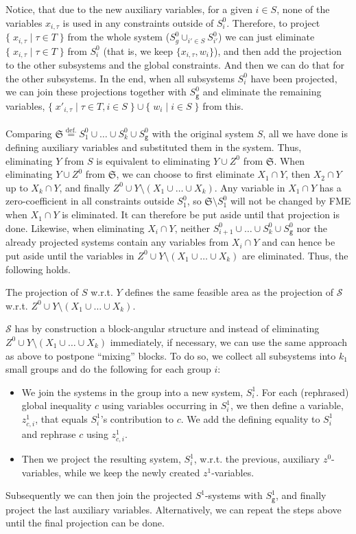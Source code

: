 \documentclass{llncs}
\newcommand{\trt}[1]{\texttt{#1}}
\newcommand{\set}[2]{\{\;{#1}\;|\;{#2}\;\}}
\begin{document}
Notice, that due to the new auxiliary variables, for a given $i\in S$, none of the variables $x_{i,\tau}$ is used in any constraints outside of $S^0_i$. Therefore, to project $\set{x_{i,\tau}}{\tau\in T}$ from the whole system ($S^0_g\cup_{i'\in S}S^0_{i'}$) we can just eliminate $\set{x_{i,\tau}}{\tau\in T}$ from $S_i^0$ (that is, we keep $\{x_{i,\tau}, w_i\}$), and then add the projection to the other subsystems and the global constraints. And then we can do that for the other subsystems. 
In the end, when all subsystems $S^0_i$ have been projected, we can join these projections together with $S^0_\trt{g}$ and eliminate the remaining variables, $\set{x'_{i,\tau}}{\tau\in T, i\in S}\cup\set{w_i}{i\in S}$ from this.
\\\\
\noindent Comparing $\mathfrak{S} \overset{\text{def.}}{=} S_1^0\cup\ldots\cup S_k^0\cup S_\trt{g}^0$ with the original system $S$, all we have done is defining auxiliary variables and substituted them in the system. Thus, eliminating $Y$ from $S$ is equivalent to eliminating $Y \cup Z^0$ from $\mathfrak{S}$. 
%
When eliminating $Y\cup Z^0$ from $\mathfrak{S}$, we can choose to first eliminate $X_1\cap Y$, then $X_2\cap Y$ up to $X_k\cap Y$, and finally $Z^0\cup Y\setminus(X_1\cup \ldots\cup X_k)$. 
Any variable in $X_1\cap Y$ has a zero-coefficient in all constraints outside $S^0_1$, so $\mathfrak{S}\setminus S^0_1$ will not be changed by FME when $X_1\cap Y$ is eliminated. It can therefore be put aside until that projection is done. 
Likewise, when eliminating $X_i\cap Y$, neither $S_{i+1}^0\cup \ldots \cup S_k^0\cup S_\trt{g}^0$ nor the already projected systems contain any variables from $X_i\cap Y$ and can hence be put aside until the variables in $Z^0\cup Y\setminus(X_1\cup \ldots\cup X_k)$ are eliminated. Thus, the following holds. 
%
\begin{proposition}
The projection of $S$ w.r.t. $Y$ defines the same feasible area as 
the projection of $\mathcal{S}$ w.r.t. $Z^0 \cup Y\setminus (X_1\cup \ldots \cup X_k)$. 
\end{proposition}
%
$\mathcal{S}$ has by construction a block-angular structure and instead of eliminating $Z^0\cup Y\setminus(X_1\cup\ldots\cup X_k)$ immediately, if necessary, we can use the same approach as above to postpone ``mixing'' blocks.
To do so, we collect all subsystems into $k_1$ small groups and do the following for each group $i$: 
\begin{itemize}\itemsep0em
\item We join the systems in the group into a new system, $S^1_i$. For each (rephrased) global inequality $c$ using variables occurring in $S^1_i$, we then define a variable, $z^1_{c,i}$, that equals $S^1_i$'s contribution to $c$. We add the defining equality to $S^1_i$ and rephrase $c$ using $z^1_{c,i}$.
\item Then we project the resulting system, $S^1_i$, w.r.t. the previous, auxiliary $z^0$-variables, while we keep the newly created $z^1$-variables.
\end{itemize} 
Subsequently we can then join the projected $S^1$-systems with $S_\trt{g}^1$, and finally project the last auxiliary variables. Alternatively, we can repeat the steps above until the final projection can be done. 
\end{document}
